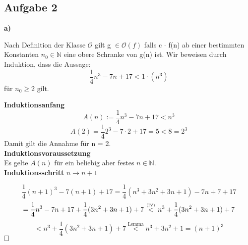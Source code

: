 \documentclass[a4paper,graphics,11pt]{article}
\newcommand{\aufgabe}[1]{\subsection*{Aufgabe #1}}
\newcommand{\up}[2]{\mathrel{\overset{\makebox[0pt]{\mbox{\normalfont\tiny #2}}}{#1}}}
\begin{document}
\aufgabe{2} 
\textbf{a)}

Nach Definition der Klasse $\mathcal{O}$ gilt g $\in \mathcal{O}(f)$ falls c $\cdot$ f(n) ab einer bestimmten Konstanten $n_0 \in \mathbb{N}$ eine obere Schranke von g(n) ist. Wir beweisen durch Induktion, dass die Aussage:
$$
	\frac{1}{4}n^3-7n+17 < 1\cdot(n^3)
$$
für $n_0 \ge 2$ gilt.\\

\begin{minipage}{1\linewidth}
	\textbf{Induktionsanfang}\\
	$$
		A(n) := \frac{1}{4}n^3-7n+17 < n^3  
	$$$$
		A(2) = \frac{1}{4} 2^3-7\cdot2+17 = 5 < 8 = 2^3
	$$
	Damit gilt die Annahme für n = 2.\\
	
	\textbf{Induktionsvoraussetzung}\\
	
	Es gelte $A(n)$ für ein beliebig aber festes $n \in \mathbb{N}$.\\
	
	\textbf{Induktionsschritt} $n \to n+1$
	
	$$
	\frac{1}{4}(n+1)^3-7(n+1)+17 = \frac{1}{4}(n^3+3n^2+3n+1)-7n+7+17
	$$$$
	=\frac{1}{4}n^3-7n+17+\frac{1}{4}(3n^2+3n+1)+7\ \up{<}{(IV)}\ n^3+\frac{1}{4}(3n^2+3n+1)+7
	$$$$
	< n^3+\frac{1}{4}(3n^2+3n+1)+7 \overset{\text{Lemma}}{<} n^3 +3n^2+1 = (n+1)^3
	$$
	$\hfill\square$\\
	
\end{minipage}


\\
\end{document}

